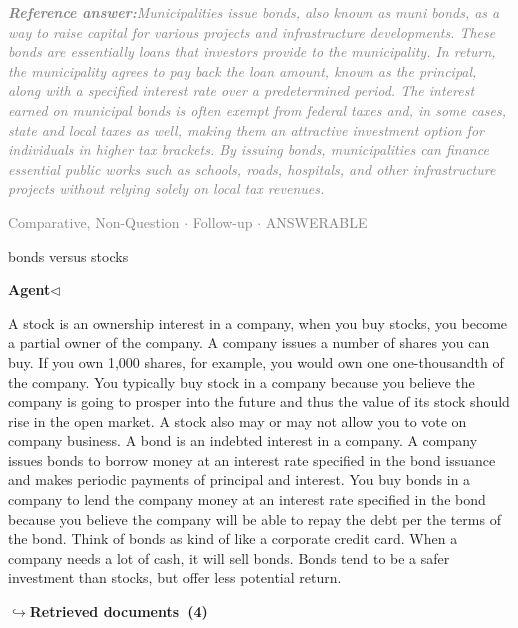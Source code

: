 \documentclass[a4paper,11pt]{article}
\begin{document}
\begin{refanswerenv}
{\footnotesize\textit{\textcolor{gray}{\textbf{Reference answer:}\enspace Municipalities issue bonds, also known as muni bonds, as a way to raise capital for various projects and infrastructure developments. These bonds are essentially loans that investors provide to the municipality. In return, the municipality agrees to pay back the loan amount, known as the principal, along with a specified interest rate over a predetermined period. The interest earned on municipal bonds is often exempt from federal taxes and, in some cases, state and local taxes as well, making them an attractive investment option for individuals in higher tax brackets. By issuing bonds, municipalities can finance essential public works such as schools, roads, hospitals, and other infrastructure projects without relying solely on local tax revenues.}}}
\end{refanswerenv}
\vspace{0.5em}
\hfill{\tiny\textcolor{gray}{Comparative, Non-Question $\cdot$ Follow-up $\cdot$ ANSWERABLE}}
\begin{userbubble}
bonds versus stocks
\end{userbubble}
\noindent\hfill{\small\textcolor{agentcolor}{\textbf{Agent\enspace$\triangleleft$}}}
\begin{agentbubble}
A stock is an ownership interest in a company, when you buy stocks, you become a partial owner of the company.   A company issues a number of shares you can buy. If you own 1,000 shares, for example, you  would own one one-thousandth of the company. You typically buy stock in a company because you believe the company is going to prosper into the future and thus the value of its stock should rise in the open market. A stock also may or may not allow you to vote on company business. A bond is an indebted interest in a company. A company issues bonds to borrow money at an interest rate specified in the bond issuance and makes periodic payments of principal and interest. You buy bonds in a company to lend the company money at an interest rate specified in the bond because you believe the company will be able to repay the debt per the terms of the bond. Think of bonds as kind of like a corporate credit card. When a company needs a lot of cash, it will sell bonds. Bonds tend to be a safer investment than stocks, but offer less potential return.
\end{agentbubble}
\noindent\hfill{\footnotesize\textcolor{doccolor}{\textbf{$\hookrightarrow$\enspace Retrieved documents~(4)}}}
\end{document}
